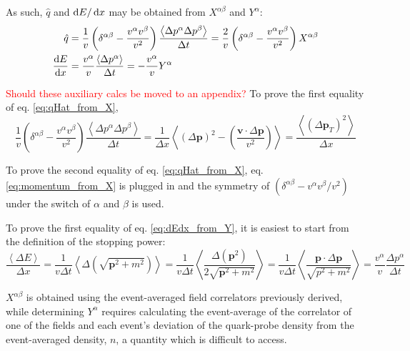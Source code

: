 As such, $\hat{q}$ and $\mathop{}\!\mathrm{d} E / \mathop{}\!\mathrm{d} x$ may be obtained from $X^{\alpha\beta}$ and $Y^\alpha$:
\begin{subequations}
	\begin{align}
		\hat{q} & = \frac{1}{v} \left(\delta^{\alpha \beta} - \frac{v^\alpha v^\beta}{v^2} \right) \frac{\left< \Delta p^\alpha \Delta p^\beta \right>}{\Delta t} = \frac{2}{v} \left(\delta^{\alpha \beta} - \frac{v^\alpha v^\beta}{v^2} \right) X^{\alpha\beta} \label{eq:qHat_from_X} \\
		\frac{\mathop{}\!\mathrm{d} E}{\mathop{}\!\mathrm{d} x} &= \frac{v^\alpha}{v} \frac{\left< \Delta p^\alpha \right>}{\Delta t} = - \frac{v^\alpha}{v} Y^\alpha \label{eq:dEdx_from_Y}
	\end{align}
	\label{eq:collision_from_tensors_v0}
\end{subequations}

\textcolor{red}{Should these auxiliary calcs be moved to an appendix?} To prove the first equality of eq. \ref{eq:qHat_from_X},
\begin{equation*}
	\frac{1}{v} \left(\delta^{\alpha \beta} - \frac{v^\alpha v^\beta}{v^2} \right) \frac{\left< \Delta p^\alpha \Delta p^\beta \right>}{\Delta t} = \frac{1}{\Delta x} \left< (\Delta \mathbf{p})^2 - \left(\frac{\mathbf{v}\cdot \Delta \mathbf{p}}{v^2} \right)\right> = \frac{\left<(\Delta{\mathbf{p}_T})^2\right>}{\Delta x}
\end{equation*}

To prove the second equality of eq. \ref{eq:qHat_from_X}, eq. \ref{eq:momentum_from_X} is plugged in and the symmetry of $(\delta^{\alpha \beta} - v^\alpha v^\beta/v^2)$ under the switch of $\alpha$ and $\beta$ is used.

To prove the first equality of eq. \ref{eq:dEdx_from_Y}, it is easiest to start from the definition of the stopping power:
\begin{equation*}
	\frac{\left< \Delta E\right>}{\Delta x}  = \frac{1}{v\Delta t} \left<  \Delta (\sqrt{\mathbf{p}^2+m^2})\right> = \frac{1}{v\Delta t} \left<  \frac{\Delta (\mathbf{p}^2)}{ 2\sqrt{\mathbf{p}^2+m^2}}\right>
	= \frac{1}{v\Delta t} \left<  \frac{\mathbf{p} \cdot \Delta \mathbf{p}}{ \sqrt{p^2+m^2}}\right> = \frac{v^\alpha}{v} \frac{\Delta p^\alpha}{\Delta t}
\end{equation*}

$X^{\alpha\beta}$ is obtained using the event-averaged field correlators previously derived, while determining $Y^\alpha$ requires calculating the event-average of the correlator of one of the fields and each event's deviation of the quark-probe density from the event-averaged density, $n$, a quantity which is difficult to access.

